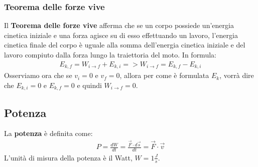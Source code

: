         \subsubsection{Teorema delle forze vive}
            Il \textbf{Teorema delle forze vive} afferma che se un corpo possiede un'energia cinetica iniziale e una forza agisce su di esso effettuando un lavoro, l'energia cinetica finale del corpo è uguale alla somma dell'energia cinetica iniziale e del lavoro compiuto dalla forza lungo la traiettoria del moto. In formula:
            \begin{align*}
                E_{k,f}=W_{i\rightarrow f}+E_{k,i}=>W_{i\rightarrow f}=E_{k,f}-E_{k,i}
            \end{align*}
            Osserviamo ora che se $v_i=0$ e $v_f=0$, allora per come è formulata $E_k$, vorrà dire che $E_{k,i}=0$ e $E_{k,f}=0$ e quindi $W_{i\rightarrow f}=0$.

    \subsection{Potenza}
        La \textbf{potenza} è definita come:
        \begin{align*}
            P=\frac{dW}{dt}=\frac{\vec{F}\cdot d\vec{s}}{dt}=\vec{F}\cdot\vec{v}
        \end{align*}
        L'unità di misura della potenza è il Watt, $W=1\frac{J}{s}$.
